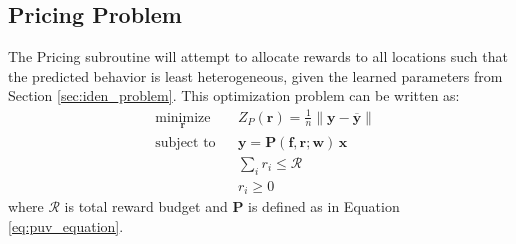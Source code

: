 \documentclass[12pt]{article}
\newcommand{\vect}[1]{\mathbf{#1}}  %
\newcommand{\matr}[1]{\mathbf{#1}}  %
\newcommand{\mean}[1]{\overline{#1}}    %
\begin{document}
    \subsection{Pricing Problem} \label{sec:pricing_problem}
    The Pricing subroutine will attempt to allocate rewards to all locations such that the predicted behavior is least heterogeneous, given the learned parameters from Section \ref{sec:iden_problem}. This optimization problem can be written as:
    \begin{equation} \label{eq:pricing_problem}
    \begin{aligned}
    & \underset{\vect{r}}{\text{minimize}}
    & & Z_P(\vect{r}) = \frac{1}{n}\lVert \vect{y} - \mean{\vect{y}} \rVert\\
    & \text{subject to}
    & & \vect{y} = \matr{P}(\matr{f}, \vect{r}; \matr{w}) \, \vect{x}\\
    &&& \sum_{i} r_i \leq \mathcal{R}\\
    &&& r_i \geq 0
    \end{aligned}
    \end{equation}
    where $\mathcal{R}$ is total reward budget and $\matr{P}$ is defined as in Equation \ref{eq:puv_equation}.
    
\end{document}
